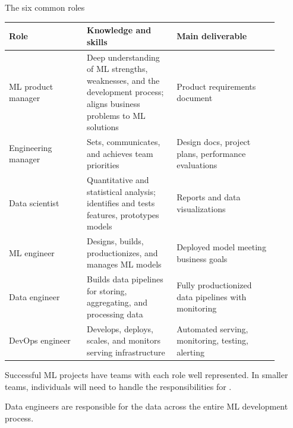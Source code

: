 \begin{frame}{The six common roles}
  \begin{withmargin}
    \begin{tdmain}
      \footnotesize
      \begin{tabular}{@{}p{0.26\linewidth}p{0.30\linewidth}p{0.34\linewidth}@{}}
        \toprule
        \textbf{Role} & \textbf{Knowledge and skills} & \textbf{Main deliverable}\\
        \midrule
        ML product manager & Deep understanding of ML strengths, weaknesses, and
          the development process; aligns business problems to ML solutions
          & Product requirements document\\[0.3em]
        Engineering manager & Sets, communicates, and achieves team priorities
          & Design docs, project plans, performance evaluations\\[0.3em]
        Data scientist & Quantitative and statistical analysis; identifies and
          tests features, prototypes models & Reports and data visualizations\\[0.3em]
        ML engineer & Designs, builds, productionizes, and manages ML models
          & Deployed model meeting business goals\\[0.3em]
        Data engineer & Builds data pipelines for storing, aggregating, and
          processing data & Fully productionized data pipelines with monitoring\\[0.3em]
        DevOps engineer & Develops, deploys, scales, and monitors serving
          infrastructure & Automated serving, monitoring, testing, alerting\\
        \bottomrule
      \end{tabular}
    \end{tdmain}
    \begin{tdmargin}
      Successful ML projects have teams with each role well represented. In
      smaller teams, individuals will need to handle the responsibilities for
      .
      \par\medskip
      Data engineers are responsible for the data across the entire ML
      development process.
    \end{tdmargin}
  \end{withmargin}
\end{frame}

